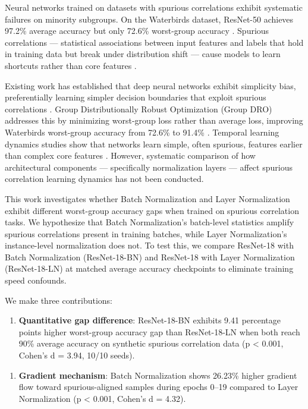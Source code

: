 
Neural networks trained on datasets with spurious correlations exhibit systematic failures on minority subgroups. On the Waterbirds dataset, ResNet-50 achieves 97.2\% average accuracy but only 72.6\% worst-group accuracy \citep{Sagawa2020Distributionally}. Spurious correlations --- statistical associations between input features and labels that hold in training data but break under distribution shift --- cause models to learn shortcuts rather than core features \citep{Geirhos2020Shortcut}.

Existing work has established that deep neural networks exhibit simplicity bias, preferentially learning simpler decision boundaries that exploit spurious correlations \citep{Geirhos2020Shortcut}. Group Distributionally Robust Optimization (Group DRO) addresses this by minimizing worst-group loss rather than average loss, improving Waterbirds worst-group accuracy from 72.6\% to 91.4\% \citep{Sagawa2020Distributionally}. Temporal learning dynamics studies show that networks learn simple, often spurious, features earlier than complex core features \citep{Toneva2019Empirical}. However, systematic comparison of how architectural components --- specifically normalization layers --- affect spurious correlation learning dynamics has not been conducted.

This work investigates whether Batch Normalization and Layer Normalization exhibit different worst-group accuracy gaps when trained on spurious correlation tasks. We hypothesize that Batch Normalization's batch-level statistics amplify spurious correlations present in training batches, while Layer Normalization's instance-level normalization does not. To test this, we compare ResNet-18 with Batch Normalization (ResNet-18-BN) and ResNet-18 with Layer Normalization (ResNet-18-LN) at matched average accuracy checkpoints to eliminate training speed confounds.

We make three contributions:

\begin{enumerate}
\item \textbf{Quantitative gap difference}: ResNet-18-BN exhibits 9.41 percentage points higher worst-group accuracy gap than ResNet-18-LN when both reach 90\% average accuracy on synthetic spurious correlation data (p < 0.001, Cohen's d = 3.94, 10/10 seeds).
\end{enumerate}

\begin{enumerate}
\item \textbf{Gradient mechanism}: Batch Normalization shows 26.23\% higher gradient flow toward spurious-aligned samples during epochs 0--19 compared to Layer Normalization (p < 0.001, Cohen's d = 4.32).
\end{enumerate}

